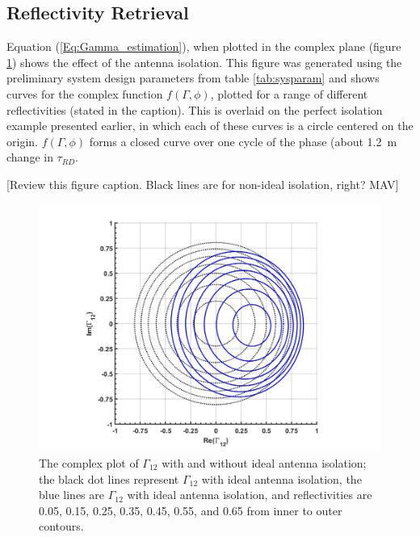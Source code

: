\documentclass[draftcls,onecolumn]{IEEEtran}  %
\begin{document}

%

\subsection{Reflectivity Retrieval}  
\label{sec: Reflectivity Retrieval}
Equation (\ref{Eq:Gamma_estimation}), when plotted in the complex plane (figure \ref{fig:Gamma12}) shows the effect of the antenna isolation.  
This figure was generated using the preliminary system design parameters from table \ref{tab:sysparam}
and shows curves for the complex function $f(\Gamma, \phi) $,  plotted for  a range of  different reflectivities (stated in the caption). 
This  is overlaid on the perfect isolation example presented earlier, in which each of these curves is  a circle centered on the origin. 
$f(\Gamma, \phi)$ forms a closed curve over one cycle of the phase (about 1.2~m change in $\tau_{RD}$. %

[Review this figure caption. Black lines are for non-ideal isolation, right?  MAV]
\begin{figure}[t!]
	\centering
    \centering
	\includegraphics[width=5 in]{pdf/Gamma12.jpg}
	\caption{The complex plot of $\Gamma_{12}$ with and without ideal antenna isolation; the black dot lines represent $\Gamma_{12}$ with ideal antenna isolation, the blue lines are $\Gamma_{12}$ with ideal antenna isolation, and reflectivities are 0.05, 0.15, 0.25, 0.35, 0.45, 0.55, and 0.65 from inner to outer contours.}
	\label{fig:Gamma12}
\end{figure}
\end{document}
